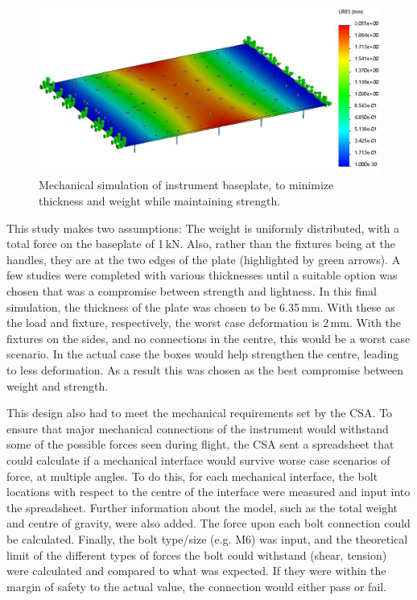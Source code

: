\begin{figure}
    \centering
    \includegraphics[width=\textwidth]{chap3_images/mech_deformation_FIXED.png}
    \caption{Mechanical simulation of instrument baseplate, to minimize thickness and weight while maintaining strength.}
    \label{fig:mech_sim}
\end{figure}

This study makes two assumptions: The weight is uniformly distributed, with a total force on the baseplate of 1\,kN. Also, rather than the fixtures being at the handles, they are at the two edges of the plate (highlighted by green arrows). A few studies were completed with various thicknesses until a suitable option was chosen that was a compromise between strength and lightness. In this final simulation, the thickness of the plate was chosen to be 6.35\,mm. With these as the load and fixture, respectively, the worst case deformation is 2\,mm. With the fixtures on the sides, and no connections in the centre, this would be a worst case scenario. In the actual case the boxes would help strengthen the centre, leading to less deformation. As a result this was chosen as the best compromise between weight and strength.

This design also had to meet the mechanical requirements set by the CSA. To ensure that major mechanical connections of the instrument would withstand some of the possible forces seen during flight, the CSA sent a spreadsheet that could calculate if a mechanical interface would survive worse case scenarios of force, at multiple angles. To do this, for each mechanical interface, the bolt locations with respect to the centre of the interface were measured and input into the spreadsheet. Further information about the model, such as the total weight and centre of gravity, were also added. The force upon each bolt connection could be calculated. Finally, the bolt type/size (e.g. M6) was input, and the theoretical limit of the different types of forces the bolt could withstand (shear, tension) were calculated and compared to what was expected. If they were within the margin of safety to the actual value, the connection would either pass or fail.

